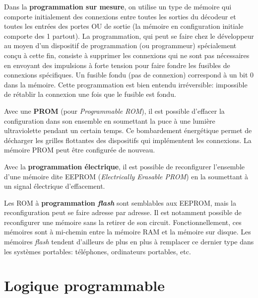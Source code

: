 \documentclass[letter, oneside]{book}
\begin{document}
\begin{enumerate}
Dans la \textbf{programmation sur mesure}, on utilise un type de mémoire qui
comporte initialement des connexions entre toutes les sorties du
décodeur et toutes les entrées des portes OU de sortie (la mémoire en
configuration initiale comporte des 1 partout). La programmation, qui
peut se faire chez le développeur au moyen d'un dispositif de
programmation (ou programmeur) spécialement conçu à cette fin,
consiste à supprimer les connexions qui ne sont pas nécessaires en
envoyant des impulsions à forte tension pour faire fondre les fusibles
de connexions spécifiques. Un fusible fondu (pas de connexion)
correspond à un bit 0 dans la mémoire. Cette programmation est bien
entendu irréversible: impossible de rétablir la connexion une fois que
le fusible est fondu.

Avec une \textbf{PROM} (pour \emph{Programmable ROM}), il est possible d'effacer la
configuration dans son ensemble en soumettant la puce à une lumière
ultraviolette pendant un certain temps. Ce bombardement énergétique
permet de décharger les grilles flottantes des dispositifs qui
implémentent les connexions. La mémoire PROM peut être configurée de
nouveau.

Avec la \textbf{programmation électrique}, il est possible de reconfigurer
l'ensemble d'une mémoire dite EEPROM (\emph{Electrically Erasable PROM})
en la soumettant à un signal électrique d'effacement. 

Les ROM à \textbf{programmation \emph{flash}} sont semblables aux EEPROM, mais la
reconfiguration peut se faire adresse par adresse.  Il est notamment
possible de reconfigurer une mémoire sans la retirer de son circuit.
Fonctionnellement, ces mémoires sont à mi-chemin entre la mémoire RAM
et la mémoire sur disque. Les mémoires \emph{flash} tendent d'ailleurs de
plus en plus à remplacer ce dernier type dans les systèmes portables:
téléphones, ordinateurs portables, etc.
\end{enumerate}

\chapter{Logique programmable}
\label{sec:org9a463b0}
\end{document}
